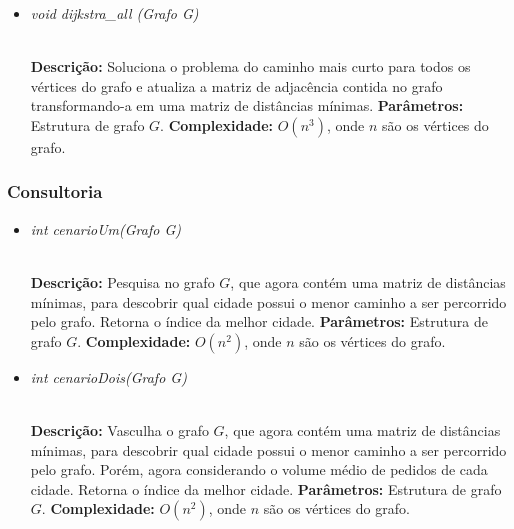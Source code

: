 \documentclass[12pt]{article}
\begin{document}
\vspace{0.2 true cm}

\begin{itemize}
 \item \begin{large}\textit{void dijkstra\_all (Grafo G)}\end{large}\\
 \subitem \textbf{Descrição:} Soluciona o problema do caminho mais curto para todos os vértices do grafo e atualiza a matriz de adjacência contida no grafo transformando-a em uma matriz de distâncias mínimas.
 \subitem \textbf{Parâmetros:} Estrutura de grafo $G$.
 \subitem \textbf{Complexidade:} $O(n^3)$, onde $n$ são os vértices do grafo.
\end{itemize}


\subsubsection{Consultoria}

\begin{itemize}
 \item \begin{large}\textit{int cenarioUm(Grafo G)}\end{large}\\
 \subitem \textbf{Descrição:} Pesquisa no grafo $G$, que agora contém uma matriz de distâncias mínimas, para descobrir qual cidade possui o menor caminho a ser percorrido pelo grafo. Retorna o índice da melhor cidade.
 \subitem \textbf{Parâmetros:} Estrutura de grafo $G$.
 \subitem \textbf{Complexidade:} $O(n^2)$, onde $n$ são os vértices do grafo.
\end{itemize}

\vspace{0.2 true cm}

\begin{itemize}
 \item \begin{large}\textit{int cenarioDois(Grafo G)}\end{large}\\
 \subitem \textbf{Descrição:} Vasculha o grafo $G$, que agora contém uma matriz de distâncias mínimas, para descobrir qual cidade possui o menor caminho a ser percorrido pelo grafo. Porém, agora considerando o volume médio de pedidos de cada cidade. Retorna o índice da melhor cidade.
 \subitem \textbf{Parâmetros:} Estrutura de grafo $G$.
 \subitem \textbf{Complexidade:} $O(n^2)$, onde $n$ são os vértices do grafo.
\end{itemize}
\end{document}
